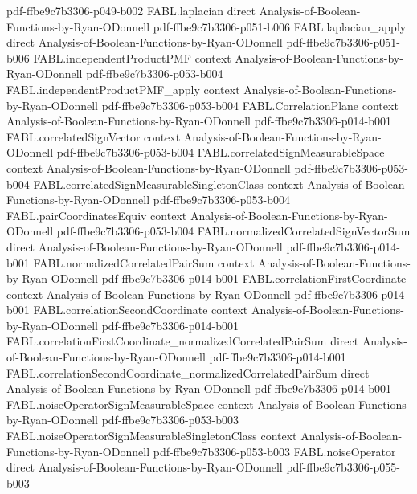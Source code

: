\begin{theorem}
  {pdf-ffbe9c7b3306-p049-b002}
\proofstep
  {FABL.laplacian}
  {direct}
  {Analysis-of-Boolean-Functions-by-Ryan-ODonnell}
  {pdf-ffbe9c7b3306-p051-b006}
\proofstep
  {FABL.laplacian_apply}
  {direct}
  {Analysis-of-Boolean-Functions-by-Ryan-ODonnell}
  {pdf-ffbe9c7b3306-p051-b006}
\proofstep
  {FABL.independentProductPMF}
  {context}
  {Analysis-of-Boolean-Functions-by-Ryan-ODonnell}
  {pdf-ffbe9c7b3306-p053-b004}
\proofstep
  {FABL.independentProductPMF_apply}
  {context}
  {Analysis-of-Boolean-Functions-by-Ryan-ODonnell}
  {pdf-ffbe9c7b3306-p053-b004}
\proofstep
  {FABL.CorrelationPlane}
  {context}
  {Analysis-of-Boolean-Functions-by-Ryan-ODonnell}
  {pdf-ffbe9c7b3306-p014-b001}
\proofstep
  {FABL.correlatedSignVector}
  {context}
  {Analysis-of-Boolean-Functions-by-Ryan-ODonnell}
  {pdf-ffbe9c7b3306-p053-b004}
\proofstep
  {FABL.correlatedSignMeasurableSpace}
  {context}
  {Analysis-of-Boolean-Functions-by-Ryan-ODonnell}
  {pdf-ffbe9c7b3306-p053-b004}
\proofstep
  {FABL.correlatedSignMeasurableSingletonClass}
  {context}
  {Analysis-of-Boolean-Functions-by-Ryan-ODonnell}
  {pdf-ffbe9c7b3306-p053-b004}
\proofstep
  {FABL.pairCoordinatesEquiv}
  {context}
  {Analysis-of-Boolean-Functions-by-Ryan-ODonnell}
  {pdf-ffbe9c7b3306-p053-b004}
\proofstep
  {FABL.normalizedCorrelatedSignVectorSum}
  {direct}
  {Analysis-of-Boolean-Functions-by-Ryan-ODonnell}
  {pdf-ffbe9c7b3306-p014-b001}
\proofstep
  {FABL.normalizedCorrelatedPairSum}
  {context}
  {Analysis-of-Boolean-Functions-by-Ryan-ODonnell}
  {pdf-ffbe9c7b3306-p014-b001}
\proofstep
  {FABL.correlationFirstCoordinate}
  {context}
  {Analysis-of-Boolean-Functions-by-Ryan-ODonnell}
  {pdf-ffbe9c7b3306-p014-b001}
\proofstep
  {FABL.correlationSecondCoordinate}
  {context}
  {Analysis-of-Boolean-Functions-by-Ryan-ODonnell}
  {pdf-ffbe9c7b3306-p014-b001}
\proofstep
  {FABL.correlationFirstCoordinate_normalizedCorrelatedPairSum}
  {direct}
  {Analysis-of-Boolean-Functions-by-Ryan-ODonnell}
  {pdf-ffbe9c7b3306-p014-b001}
\proofstep
  {FABL.correlationSecondCoordinate_normalizedCorrelatedPairSum}
  {direct}
  {Analysis-of-Boolean-Functions-by-Ryan-ODonnell}
  {pdf-ffbe9c7b3306-p014-b001}
\proofstep
  {FABL.noiseOperatorSignMeasurableSpace}
  {context}
  {Analysis-of-Boolean-Functions-by-Ryan-ODonnell}
  {pdf-ffbe9c7b3306-p053-b003}
\proofstep
  {FABL.noiseOperatorSignMeasurableSingletonClass}
  {context}
  {Analysis-of-Boolean-Functions-by-Ryan-ODonnell}
  {pdf-ffbe9c7b3306-p053-b003}
\proofstep
  {FABL.noiseOperator}
  {direct}
  {Analysis-of-Boolean-Functions-by-Ryan-ODonnell}
  {pdf-ffbe9c7b3306-p055-b003}
\proofstep

\end{theorem}

